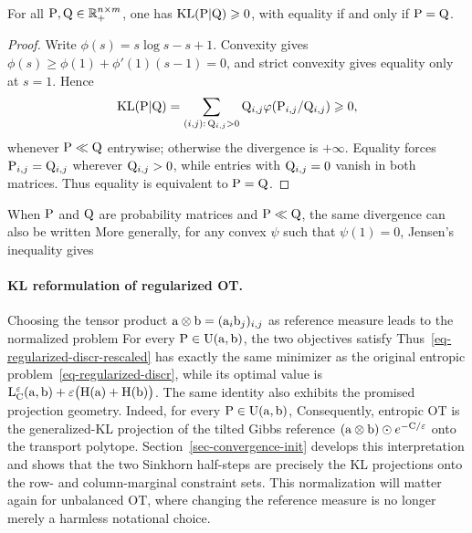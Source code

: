 \begin{prop}\label{prop-kl-distance-like}
	For all $\P,\Q\in\RR_+^{n\times m}$, one has $\KLD(\P|\Q)\geq0$, with equality if and only if $\P=\Q$.
\end{prop}
\begin{proof}
	Write $\phi(s)=s\log s-s+1$. Convexity gives $\phi(s)\geq \phi(1)+\phi'(1)(s-1)=0$, and strict convexity gives equality only at $s=1$. Hence
	\[
		\KLD(\P|\Q)=\sum_{(i,j):\,\Q_{i,j}>0}\Q_{i,j}
		\phi(\P_{i,j}/\Q_{i,j})\geq0,
	\]
	whenever $\P\ll\Q$ entrywise; otherwise the divergence is $+\infty$. Equality forces $\P_{i,j}=\Q_{i,j}$ wherever $\Q_{i,j}>0$, while entries with $\Q_{i,j}=0$ vanish in both matrices. Thus equality is equivalent to $\P=\Q$.
\end{proof}

When $\P$ and $\Q$ are probability matrices and $\P\ll\Q$, the same divergence can also be written
More generally, for any convex $\psi$ such that $\psi(1)=0$, Jensen's inequality gives

\paragraph{KL reformulation of regularized OT.}
Choosing the tensor product $\a \otimes \b = (\a_i \b_j)_{i,j}$ as reference measure leads to the normalized problem
For every $\P\in\CouplingsD(\a,\b)$, the two objectives satisfy
Thus~\eqref{eq-regularized-discr-rescaled} has exactly the same minimizer as the original entropic problem~\eqref{eq-regularized-discr}, while its optimal value is
\(
	\MKD_\C^\epsilon(\a,\b)+\epsilon\bigl(\HD(\a)+\HD(\b)\bigr)
\).
The same identity also exhibits the promised projection geometry. Indeed, for every
$\P\in\CouplingsD(\a,\b)$,
Consequently, entropic OT is the generalized-KL projection of the tilted Gibbs reference
$(\a\otimes\b)\odot e^{-\C/\epsilon}$ onto the transport polytope. Section~\ref{sec-convergence-init} develops this interpretation and shows that the two Sinkhorn half-steps are precisely the KL projections onto the row- and column-marginal constraint sets.
This normalization will matter again for unbalanced OT, where changing the reference measure is no longer merely a harmless notational choice.

